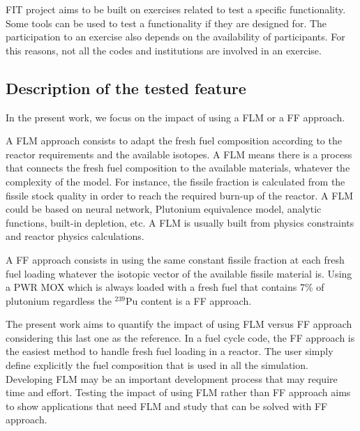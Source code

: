 FIT project aims to be built on exercises related to test a specific
functionality. Some tools can be used to test a functionality if they are
designed for. The participation to an exercise also depends on the availability
of participants. For this reasons, not all the codes and institutions are
involved in an exercise.

\subsection{Description of the tested feature}

In the present work, we focus on the impact of using a \gls{FLM} or a \gls{FF} approach. 

A \gls{FLM} approach consists to adapt the fresh fuel composition according to
the reactor requirements and the available isotopes. A \gls{FLM} means there is a
process that connects the fresh fuel composition to the available materials,
whatever the complexity of the model. For instance, the fissile fraction is
calculated from the fissile stock quality in order to reach the required burn-up
of the reactor. A \gls{FLM} could be based on neural network, Plutonium
equivalence model, analytic functions, built-in depletion, etc. A \gls{FLM} is
usually built from physics constraints and reactor physics calculations. 

A \gls{FF} approach consists in using the same constant fissile
fraction at each fresh fuel loading whatever the isotopic vector of the
available fissile material is. Using a PWR MOX which is always loaded with a
fresh fuel that contains 7\% of plutonium regardless the $^{239}$Pu content is a
\gls{FF} approach. 

The present work aims to quantify the impact of using \gls{FLM} versus \gls{FF}
approach considering this last one as the reference. In a fuel cycle code, the
\gls{FF} approach is the easiest method to handle fresh fuel loading in a reactor. The
user simply define explicitly the fuel composition that is used in all the
simulation. Developing \gls{FLM} may be an important development process that
may require time and effort. Testing the impact of using \gls{FLM} rather than
\gls{FF} approach aims to show applications that need \gls{FLM} and study that can be
solved with \gls{FF} approach.

